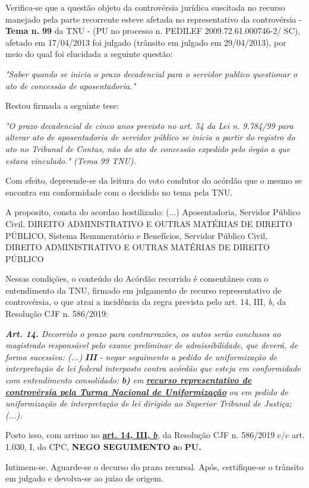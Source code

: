 \documentclass[12pt]{article}
\begin{document}
\justifying
\noindent Verifica-se que a questão objeto da controvérsia jurídica suscitada no recurso manejado pela parte recorrente esteve afetada no representativo da controvérsia - \textbf{Tema n. }\textbf{99} da TNU - (PU no processo n. PEDILEF 2009.72.61.000746-2/ SC),  afetado em 17/04/2013 foi julgado (trânsito em julgado em 29/04/2013), por meio do qual foi elucidada a seguinte questão:

\noindent \textit{"Saber quando se inicia o prazo decadencial para o servidor publico questionar o ato de concessão de aposentadoria."}

\noindent Restou firmada a seguinte tese:

\noindent \textit{"O prazo decadencial de cinco anos previsto no art. 54 da Lei n. 9.784/99 para alterar ato de aposentadoria de servidor público se inicia a partir do registro do ato no Tribunal de Contas, não do ato de concessão expedido pelo órgão a que estava vinculado." (Tema 99 TNU).}

\noindent Com efeito, depreende-se da leitura do voto condutor do acórdão que o mesmo se encontra em conformidade com o decidido no  tema pela TNU.

\noindent A proposito, consta do acordao hostilizado: (...) Aposentadoria, Servidor Público Civil, DIREITO ADMINISTRATIVO E OUTRAS MATÉRIAS DE DIREITO PÚBLICO, Sistema Remuneratório e Benefícios, Servidor Público Civil, DIREITO ADMINISTRATIVO E OUTRAS MATÉRIAS DE DIREITO PÚBLICO

\noindent Nessas condições, o conteúdo do Acórdão recorrido é consentâneo com o entendimento da TNU, firmado em julgamento de recurso representativo de controvérsia, o que atrai a incidência da regra prevista pelo art. 14, III, \textit{b,} da Resolução CJF n. 586/2019:

\noindent \textit{\textbf{Art. 14.}}\textit{ Decorrido o prazo para contrarrazões, os autos serão conclusos ao magistrado responsável pelo exame preliminar de admissibilidade, que deverá, de forma sucessiva: (...) }\textit{\textbf{III }}\textit{- negar seguimento a pedido de uniformização de interpretação de lei federal interposto contra acórdão que esteja em conformidade com entendimento consolidado: }\textit{\textbf{b)}}\textit{ em }\uline{\textit{\textbf{recurso representativo de controvérsia pela Turma Nacional de Uniformização}}}\textit{ ou em pedido de uniformização de interpretação de lei dirigido ao Superior Tribunal de Justiça;(...).}

\noindent Posto isso, com arrimo no \uline{\textbf{art. 14, III, }}\uline{\textit{\textbf{b}}}\textit{,} da Resolução CJF n. 586/2019 c/c art. 1.030, I, do CPC, \textbf{NEGO SEGUIMENTO }\textbf{a}o\textbf{ PU}\textbf{.}

\noindent Intimem-se. Aguarde-se o decurso do prazo recursal. Após, certifique-se o trânsito em julgado e devolva-se ao juízo de origem.
\end{document}
